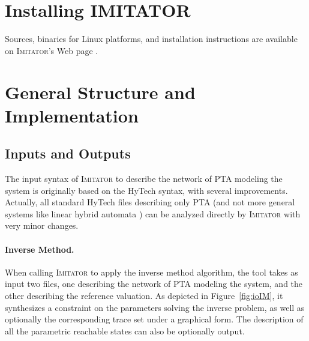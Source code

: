 \documentclass[a4paper,11pt]{article}
\newcommand{\hytech}{{\sc HyTech}}
\newcommand{\imitator}{\textsc{Imitator}}
\newcommand{\phaver}{PHAVer}
\newcommand{\paragraphe}[1]{\paragraph{#1.}}
\begin{document}




\section{Installing IMITATOR}

Sources, binaries for Linux platforms, and installation instructions are available on \imitator{}'s Web page \cite{imitator}.


\section[Implementation]{General Structure and Implementation} \label{sec:implementation}



\subsection{Inputs and Outputs}

The input syntax of \imitator{} to describe the network of PTA modeling the system is originally based on the \hytech{} syntax, with several improvements.
Actually, all standard \hytech{} files describing only PTA (and not more general systems like linear hybrid automata \cite{achh92}) can be analyzed directly by \imitator{} with very minor changes.


\paragraphe{Inverse Method}
When calling \imitator{} to apply the inverse method algorithm, the tool takes as input two files, one describing the network of PTA modeling the system, and the other describing the reference valuation.
As depicted in Figure~\ref{fig:ioIM}, it synthesizes a constraint on the parameters solving the inverse problem, as well as optionally the corresponding trace set under a graphical form.
The description of all the parametric reachable states can also be optionally output.
\end{document}
